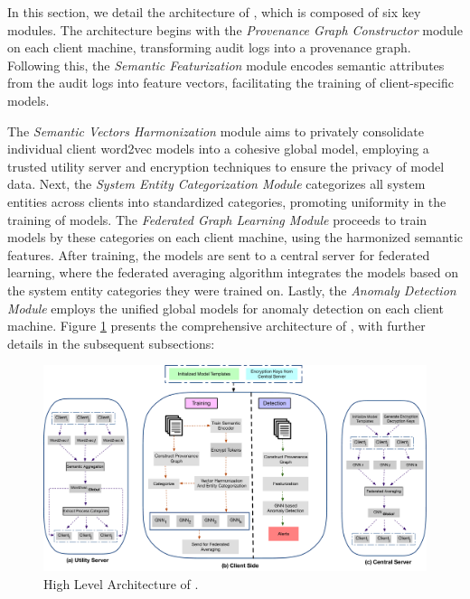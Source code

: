 In this section, we detail the architecture of \Sys, which is composed of six key modules. The architecture begins with the \textit{Provenance Graph Constructor} module on each client machine, transforming audit logs into a provenance graph. Following this, the \textit{Semantic Featurization} module encodes semantic attributes from the audit logs into feature vectors, facilitating the training of client-specific \gnnshort models.

The \textit{Semantic Vectors Harmonization} module aims to privately consolidate individual client word2vec models into a cohesive global model, employing a trusted utility server and encryption techniques to ensure the privacy of model data. Next, the \textit{System Entity Categorization Module}  categorizes all system entities across clients into standardized categories, promoting uniformity in the training of \gnnshort models. The \textit{Federated Graph Learning Module}  proceeds to train \gnnshort models by these categories on each client machine, using the harmonized semantic features. After training, the models are sent to a central server for federated learning, where the federated averaging algorithm integrates the models based on the system entity categories they were trained on. Lastly, the \textit{Anomaly Detection Module}  employs the unified global models for anomaly detection on each client machine. Figure \ref{fig:arch} presents the comprehensive architecture of \Sys, with further details in the subsequent subsections:

\begin{figure}[t!]
  \centering
  \includegraphics[width=\textwidth]{fig/archv2.pdf}
  \caption{High Level Architecture of \Sys. }
  \vspace{-3ex}
  \label{fig:arch}
\end{figure}

